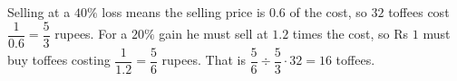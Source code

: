 Selling at a $40\%$ loss means the selling price is $0.6$ of the cost, so $32$ toffees cost $\dfrac1{0.6}=\dfrac53$ rupees. For a $20\%$ gain he must sell at $1.2$ times the cost, so Rs $1$ must buy toffees costing $\dfrac{1}{1.2}=\dfrac56$ rupees. That is $\dfrac{5}{6}\div\dfrac{5}{3}\cdot32=\boxed{16}$ toffees.
